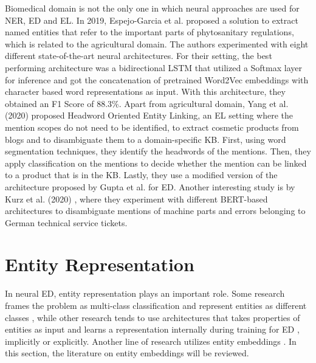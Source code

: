 \documentclass{report}
\theoremstyle{definition}
\theoremstyle{remark}
\begin{document}
Biomedical domain is not the only one in which neural approaches are used for NER, ED and EL. In 2019, Espejo-Garcia et al. \cite{agricultural} proposed a solution to extract named entities that refer to the important parts of phytosanitary regulations, which is related to the agricultural domain. The authors experimented with eight different state-of-the-art neural architectures. For their setting, the best performing architecture was a bidirectional LSTM \cite{bilstm} that utilized a Softmax layer for inference and got the concatenation of pretrained Word2Vec \cite{w2v} embeddings with character based word representations as input. With this architecture, they obtained an F1 Score of 88.3\%. Apart from agricultural domain, Yang et al. (2020) \cite{cosmetic} proposed Headword Oriented Entity Linking, an EL setting where the mention scopes do not need to be identified, to extract cosmetic products from blogs and to disambiguate them to a domain-specific KB. First, using word segmentation techniques, they identify the headwords of the mentions. Then, they apply classification on the mentions to decide whether the mention can be linked to a product that is in the KB. Lastly, they use a modified version of the architecture proposed by Gupta et al. \cite{gupta} for ED.  Another interesting study is by Kurz et al. (2020) \cite{TechTickets}, where they experiment with different BERT-based architectures to disambiguate mentions of machine parts and errors belonging to German technical service tickets.

\section{Entity Representation}
\label{entityRep}

In neural ED, entity representation plays an important role. Some research frames the problem as multi-class classification and represent entities as different classes \cite{bertEL,MedDiffArc,MedFeedback}, while other research tends to use architectures that takes properties of entities as input and learns a representation internally during training for ED \cite{scalablezeroshot}, implicitly or explicitly. Another line of research utilizes entity embeddings \cite{REL,kolitsas,dca,MedicalTriplet}. In this section, the literature on entity embeddings will be reviewed.
\end{document}
